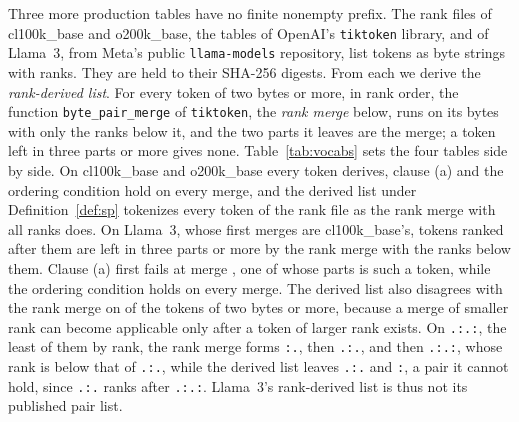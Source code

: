 \documentclass[11pt,a4paper]{article}
\theoremstyle{definition}
\theoremstyle{plain}
\newcommand{\code}[1]{\texttt{#1}}
\begin{document}
Three more production tables have no finite nonempty prefix. The rank files of cl100k\_base and o200k\_base, the tables
of OpenAI's \code{tiktoken} library, and of Llama~3, from Meta's public \code{llama-models} repository, list tokens as
byte strings with ranks. They are held to their SHA-256 digests. From each we derive the \emph{rank-derived list}. For
every token of two bytes or more, in rank order, the function \code{byte\_pair\_merge} of \code{tiktoken}, the
\emph{rank merge} below, runs on its bytes with only the ranks below it, and the two parts it leaves are the merge; a
token left in three parts or more gives none. Table~\ref{tab:vocabs} sets the four tables side by side. On cl100k\_base
and o200k\_base every token derives, clause (a) and the ordering condition hold on every merge, and the derived list
under Definition~\ref{def:sp} tokenizes every token of the rank file as the rank merge with all ranks does. On Llama~3,
whose first \LlamaShared{} merges are cl100k\_base's, \LlamaUnreachable{} tokens ranked after them are left in three
parts or more by the rank merge with the ranks below them. Clause (a) first fails at merge \LlamaClauseA{}, one of whose
parts is such a token, while the ordering condition holds on every merge. The derived list also disagrees with the rank
merge on \LlamaRankPairDisagree{} of the \LlamaVocabTokens{} tokens of two bytes or more, because a merge of smaller
rank can become applicable only after a token of larger rank exists. On \code{.:.:}, the least of them by rank, the rank
merge forms \code{:.}, then \code{.:.}, and then \code{.:.:}, whose rank is below that of \code{.:.}, while the derived
list leaves \code{.:.} and \code{:}, a pair it cannot hold, since \code{.:.} ranks after \code{.:.:}. Llama~3's
rank-derived list is thus not its published pair list.
\end{document}
